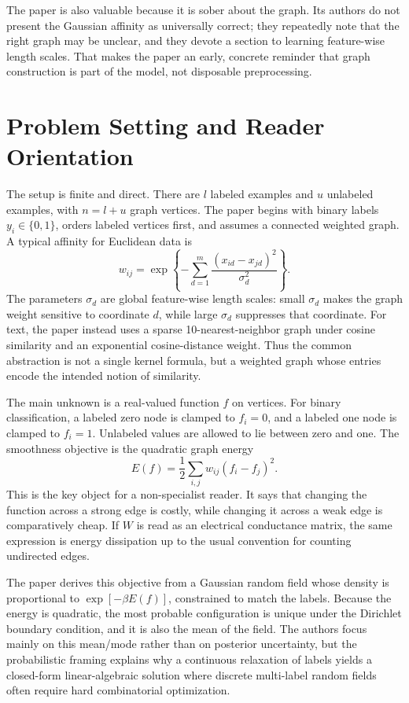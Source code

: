 \documentclass[11pt]{article}
\begin{document}
The paper is also valuable because it is sober about the graph. Its authors do
not present the Gaussian affinity as universally correct; they repeatedly note
that the right graph may be unclear, and they devote a section to learning
feature-wise length scales. That makes the paper an early, concrete reminder
that graph construction is part of the model, not disposable preprocessing.

\section{Problem Setting and Reader Orientation}

The setup is finite and direct. There are \(l\) labeled examples and \(u\)
unlabeled examples, with \(n=l+u\) graph vertices. The paper begins with binary
labels \(y_i\in\{0,1\}\), orders labeled vertices first, and assumes a
connected weighted graph. A typical affinity for Euclidean data is
\begin{equation}
  w_{ij}
  =
  \exp\left\{
    -\sum_{d=1}^{m} \frac{(x_{id}-x_{jd})^2}{\sigma_d^2}
  \right\}.
  \label{eq:p05-gaussian-weight}
\end{equation}
The parameters \(\sigma_d\) are global feature-wise length scales: small
\(\sigma_d\) makes the graph weight sensitive to coordinate \(d\), while large
\(\sigma_d\) suppresses that coordinate. For text, the paper instead uses a
sparse 10-nearest-neighbor graph under cosine similarity and an exponential
cosine-distance weight. Thus the common abstraction is not a single kernel
formula, but a weighted graph whose entries encode the intended notion of
similarity.

The main unknown is a real-valued function \(f\) on vertices. For binary
classification, a labeled zero node is clamped to \(f_i=0\), and a labeled one
node is clamped to \(f_i=1\). Unlabeled values are allowed to lie between zero
and one. The smoothness objective is the quadratic graph energy
\begin{equation}
  E(f)
  =
  \frac{1}{2}\sum_{i,j} w_{ij}(f_i-f_j)^2.
  \label{eq:p05-energy}
\end{equation}
This is the key object for a non-specialist reader. It says that changing the
function across a strong edge is costly, while changing it across a weak edge is
comparatively cheap. If \(W\) is read as an electrical conductance matrix, the
same expression is energy dissipation up to the usual convention for counting
undirected edges.

The paper derives this objective from a Gaussian random field whose density is
proportional to \(\exp[-\beta E(f)]\), constrained to match the labels. Because
the energy is quadratic, the most probable configuration is unique under the
Dirichlet boundary condition, and it is also the mean of the field. The authors
focus mainly on this mean/mode rather than on posterior uncertainty, but the
probabilistic framing explains why a continuous relaxation of labels yields a
closed-form linear-algebraic solution where discrete multi-label random fields
often require hard combinatorial optimization.
\end{document}
